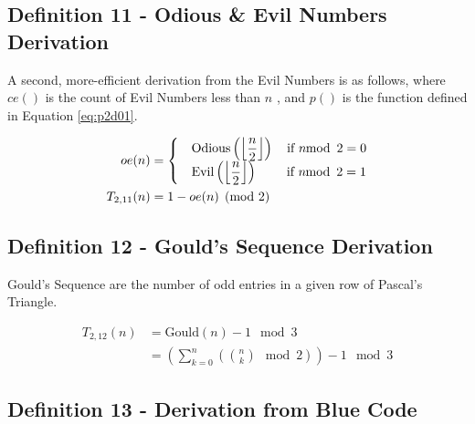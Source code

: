 \documentclass[conference]{IEEEtran}
\begin{document}
\subsection{Definition 11 - Odious \& Evil Numbers Derivation}


A second, more-efficient derivation from the Evil Numbers is as follows, where $ce()$ is the count of Evil Numbers less than $n$ \cite{OEIS-A159481}, and $p()$ is the function defined in Equation \ref{eq:p2d01}.

\begin{equation}
    \label{eq:p2d11}
    \begin{aligned}
     oe(n) &= \begin{cases}
         &\text{Odious}\left(\floor{\dfrac{n}{2}}\right) \quad \text{if } n \mod{2} = 0 \\
         &\text{Evil}\left(\floor{\dfrac{n}{2}}\right) \quad\quad\; \text{if } n \mod{2} = 1
     \end{cases} \\
T_{2,11}(n) &= 1 - oe(n) \pmod{2}
    \end{aligned}
\end{equation}

\subsection{Definition 12 - Gould's Sequence Derivation}


Gould's Sequence \cite{OEIS-Gould} are the number of odd entries in a given row of Pascal's Triangle.


\begin{equation}
    \label{eq:p2d12}
    \begin{aligned}
T_{2,12}(n) &= \text{Gould}(n) - 1 \mod{3} \\
            &= \left(\sum_{k=0}^n \left(\binom{n}{k} \mod{2} \right)\right) - 1 \mod{3}
    \end{aligned}
\end{equation}

\subsection{Definition 13 - Derivation from Blue Code}
\end{document}

